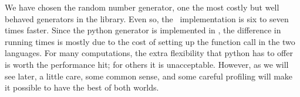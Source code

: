 We have chosen the  random number generator, one the most costly but well behaved
generators in the library. Even so, the \cpp\ implementation is six to seven times
faster. Since the python generator  is implemented in \cc, the difference in
running times is mostly due to the cost of setting up the function call in the two
languages. For many computations, the extra flexibility that python has to offer is worth the
performance hit; for others it is unacceptable. However, as we will see later, a little care,
some common sense, and some careful profiling will make it possible to have the best of both
worlds.

